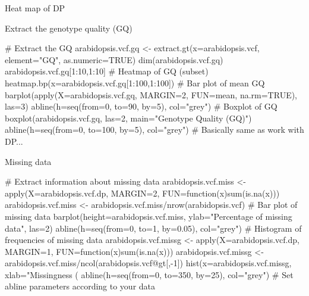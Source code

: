 \documentclass[compress, ucs, xelatex, 11pt, xcolor=svgnames, aspectratio=169,
	hyperref={
		bookmarks=true,
		unicode=true,
		colorlinks=true,
		pdftitle={Molecular data in R},
		plainpages=false,
		pdfauthor={Vojtech Zeisek},
		pdfsubject={Course about phylogeny and evolution in R},
		pdfcreator={XeLaTeX},
		pdfkeywords={R, evolution, phylogeny, molecular data},
		linkcolor=Crimson, %
		anchorcolor=Magenta, %
		citecolor=Magenta, %
		filecolor=Magenta, %
		menucolor=Magenta, %
		urlcolor=DodgerBlue, %
		pdftex},
	url={hyphens, lowtilde} %
	]{beamer}
\renewcommand{\texttt}[1]{\colorbox{Beige}{{\ttfamily #1}}}
\begin{document}
\begin{frame}{Heat map of DP}
	\begin{center}
		\texttt{[image: vcf\_dp\_heatmap.png]}
	\end{center}
\end{frame}

\begin{frame}[fragile]{Extract the genotype quality (GQ)}
	\begin{spluscode}
    # Extract the GQ
    arabidopsis.vcf.gq <- extract.gt(x=arabidopsis.vcf, element="GQ",
      as.numeric=TRUE)
    dim(arabidopsis.vcf.gq)
    arabidopsis.vcf.gq[1:10,1:10]
    # Heatmap of GQ (subset)
    heatmap.bp(x=arabidopsis.vcf.gq[1:100,1:100])
    # Bar plot of mean GQ
    barplot(apply(X=arabidopsis.vcf.gq, MARGIN=2, FUN=mean, na.rm=TRUE),
      las=3)
    abline(h=seq(from=0, to=90, by=5), col="grey")
    # Boxplot of GQ
    boxplot(arabidopsis.vcf.gq, las=2, main="Genotype Quality (GQ)")
    abline(h=seq(from=0, to=100, by=5), col="grey")
    # Basically same as work with DP...
	\end{spluscode}
\end{frame}

\begin{frame}[fragile]{Missing data}
	\begin{spluscode}
    # Extract information about missing data
    arabidopsis.vcf.miss <- apply(X=arabidopsis.vcf.dp, MARGIN=2,
      FUN=function(x){sum(is.na(x))})
    arabidopsis.vcf.miss <- arabidopsis.vcf.miss/nrow(arabidopsis.vcf)
    # Bar plot of missing data
    barplot(height=arabidopsis.vcf.miss, ylab="Percentage of missing data",
      las=2)
    abline(h=seq(from=0, to=1, by=0.05), col="grey")
    # Histogram of frequencies of missing data
    arabidopsis.vcf.missg <- apply(X=arabidopsis.vcf.dp, MARGIN=1,
      FUN=function(x){sum(is.na(x))})
    arabidopsis.vcf.missg <-
      arabidopsis.vcf.miss/ncol(arabidopsis.vcf@gt[,-1])
    hist(x=arabidopsis.vcf.missg, xlab="Missingness (%
    abline(h=seq(from=0, to=350, by=25), col="grey")
    # Set abline parameters according to your data
	\end{spluscode}
\end{frame}
\end{document}
